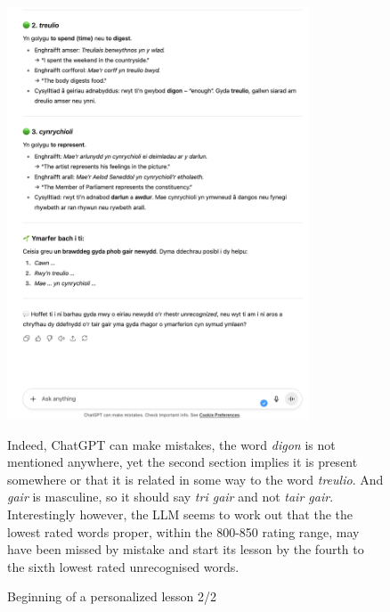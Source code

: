 \begin{figure}[h]
    \centering
    \includegraphics[width=0.8\textwidth]{figures/lesson-2.png}
    \caption{Beginning of a personalized lesson 2/2}
    \label{fig:lesson2}
    \medskip
    \small
    Indeed, ChatGPT can make mistakes, the word \textit{digon} is not mentioned anywhere, yet the second section implies it is present somewhere or that it is related in some way to the word \textit{treulio}. And \textit{gair} is masculine, so it should say \textit{tri gair} and not \textit{tair gair}. Interestingly however, the LLM seems to work out that the the lowest rated words proper, within the 800-850 rating range, may have been missed by mistake and start its lesson by the fourth to the sixth lowest rated unrecognised words.
\end{figure}
